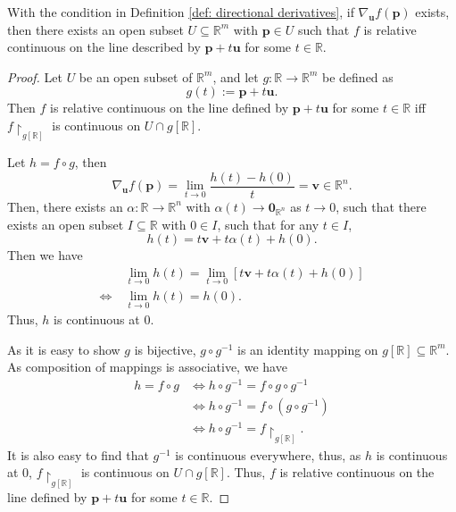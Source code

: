 \begin{theorem}
	\label{thm: directional derivatives: relative continuous on a straight line}
	With the condition in Definition \ref{def: directional derivatives}, if $\nabla_{\mathbf u} f(\mathbf p)$ exists, then there exists an open subset $U \subseteq \mathbb R^m$ with $\mathbf p \in U$ such that $f$ is relative continuous on the line described by $\mathbf p + t\mathbf u$ for some $t \in \mathbb R$.
	
	\begin{proof}
		Let $U$ be an open subset of $\mathbb R^m$, and let $g: \mathbb R \to \mathbb R^m$ be defined as
		$$
		g(t) := \mathbf p + t\mathbf u.
		$$
		Then $f$ is relative continuous on the line defined by $\mathbf p + t \mathbf u$ for some $t \in \mathbb R$ iff $f \restriction_{g[\mathbb R]}$ is continuous on $U \cap g[\mathbb R]$.
		
		Let $h = f \circ g$, then
		$$
		\nabla_{\mathbf u} f(\mathbf p) = \lim_{t \to 0} \frac{h(t) - h(0)}{t} = \mathbf v \in \mathbb R^n.
		$$
		Then, there exists an $\alpha: \mathbb R \to \mathbb R^n$ with $\alpha(t) \to \mathbf 0_{\mathbb R^n}$ as $t \to 0$, such that there exists an open subset $I \subseteq \mathbb R$ with $0 \in I$, such that for any $t \in I$,
		$$
		h(t) = t\mathbf v + t\alpha(t) + h(0).
		$$
		Then we have
		$$
		\begin{aligned}
		& \ \lim_{t \to 0} h(t) = \lim_{t \to 0} [t\mathbf v + t\alpha(t) + h(0)] \\
		\iff & \ \lim_{t \to 0} h(t) = h(0).
		\end{aligned}
		$$
		Thus, $h$ is continuous at $0$.
		
		As it is easy to show $g$ is bijective, $g \circ g^{-1}$ is an identity mapping on $g[\mathbb R] \subseteq \mathbb R^m$. As composition of mappings is associative, we have
		$$
		\begin{aligned}
		h = f \circ g &\iff h \circ g^{-1} = f \circ g \circ g^{-1} \\
		&\iff h \circ g^{-1} = f \circ (g \circ g^{-1}) \\
		&\iff h \circ g^{-1} = f \restriction_{g[\mathbb R]}.
		\end{aligned}
		$$
		It is also easy to find that $g^{-1}$ is continuous everywhere, thus, as $h$ is continuous at $0$, $f \restriction_{g[\mathbb R]}$ is continuous on $U \cap g[\mathbb R]$. Thus, $f$ is relative continuous on the line defined by $\mathbf p + t\mathbf u$ for some $t \in \mathbb R$.
	\end{proof}
\end{theorem}


